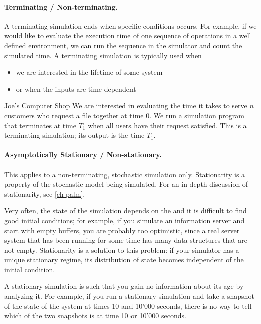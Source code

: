\paragraph{Terminating / Non-terminating.}
A terminating simulation ends when specific conditions occurs. For
example, if we would like to evaluate the execution time of one
sequence of operations in a well defined environment, we can run
the sequence in the simulator and count the simulated time. A
terminating simulation is typically used when \begin{itemize}
    \item we are interested in the lifetime of some system
    \item or when the inputs are time dependent
\end{itemize}


\begin{ex}{Joe's Computer Shop}
\label{ex-static} We are interested in evaluating the time it
takes to serve $n$ customers who request a file together at time
$0$. We run a simulation program that terminates at time $T_1$
when all users have their request satisfied. This is a terminating
simulation; its output is the time $T_1$.
\end{ex}



\paragraph{Asymptotically Stationary / Non-stationary.}
This applies to a non-terminating, stochastic simulation only.
Stationarity is a property of the stochastic model being
simulated. For an in-depth discussion of stationarity, see
\cref{ch-palm}.

Very often, the state of the simulation depends on the
 and it is difficult to find good
initial conditions; for example, if you simulate an information
server and start with empty buffers, you are probably too
optimistic, since a real server system that has been running
for some time has many data structures that are not empty.
Stationarity is a solution to this problem: if your simulator
has a unique stationary regime, its distribution of state
becomes independent of the initial condition.

A stationary simulation is such that you gain no information
about its age by analyzing it. For example, if you run a
stationary simulation and take a snapshot of the state of the
system at times 10 and 10'000 seconds, there is no way to tell
which of the two snapshots is at time 10 or 10'000 seconds.


